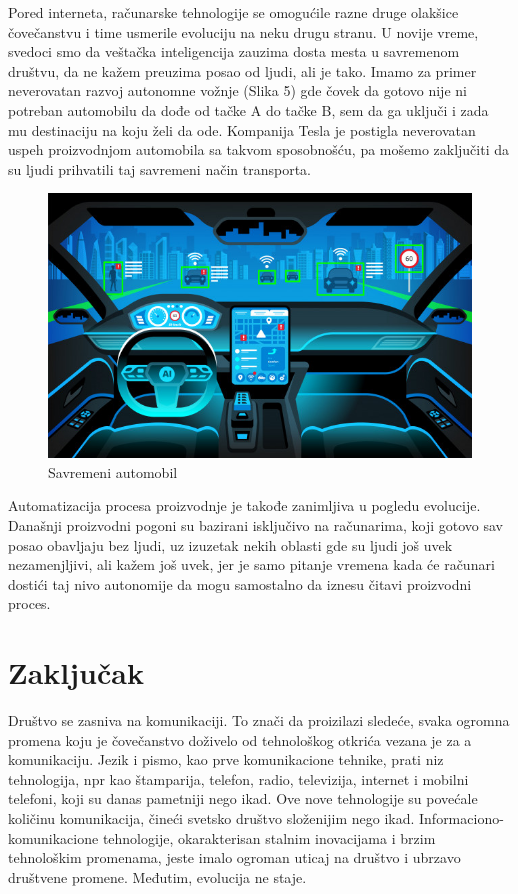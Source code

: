 \documentclass[10pt]{article}
\begin{document}
	Pored interneta, računarske tehnologije se omogućile razne druge olakšice čovečanstvu i time usmerile evoluciju na neku drugu stranu. U novije vreme, svedoci smo da veštačka inteligencija zauzima dosta mesta u savremenom društvu, da ne kažem preuzima posao od ljudi, ali je tako. Imamo za primer neverovatan razvoj autonomne vožnje (Slika 5) gde čovek da gotovo nije ni potreban automobilu da dođe od tačke A do tačke B, sem da ga uključi i zada mu destinaciju na koju želi da ode. Kompanija Tesla je postigla neverovatan uspeh proizvodnjom automobila sa takvom sposobnošću, pa mošemo zaključiti da su ljudi prihvatili taj savremeni način transporta. 
	
	
\begin{figure}
    \centering
    \includegraphics[scale=0.5]{car.jpg}
    \caption{Savremeni automobil}
\end{figure}
	
	Automatizacija procesa proizvodnje je takođe zanimljiva u pogledu evolucije. Današnji proizvodni pogoni su bazirani isključivo na računarima, koji gotovo sav posao obavljaju bez ljudi, uz izuzetak nekih oblasti gde su ljudi još uvek nezamenjljivi, ali kažem još uvek, jer je samo pitanje vremena kada će računari dostići taj nivo autonomije da mogu samostalno da iznesu čitavi proizvodni proces.
    
    \section{Zaključak}
 
    Društvo se zasniva na komunikaciji. To znači da proizilazi sledeće, svaka ogromna promena koju je čovečanstvo doživelo od tehnološkog otkrića vezana je za a komunikaciju. Jezik i pismo, kao prve komunikacione tehnike, prati niz tehnologija, npr kao štamparija, telefon, radio, televizija, internet i mobilni  telefoni, koji su danas pametniji nego ikad. Ove nove tehnologije su povećale količinu komunikacija, čineći svetsko društvo složenijim nego ikad. Informaciono-komunikacione tehnologije, okarakterisan stalnim inovacijama i brzim tehnološkim promenama, jeste imalo ogroman uticaj na društvo i ubrzavo društvene promene. Međutim, evolucija ne staje.
    
\end{document}
